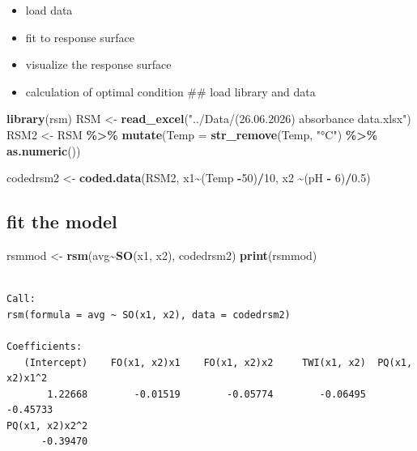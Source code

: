 \documentclass[
  12pt,
]{article}
\newenvironment{Shaded}{\begin{snugshade}}{\end{snugshade}}
\newcommand{\AttributeTok}[1]{\textcolor[rgb]{0.13,0.29,0.53}{#1}}
\newcommand{\DecValTok}[1]{\textcolor[rgb]{0.00,0.00,0.81}{#1}}
\newcommand{\FloatTok}[1]{\textcolor[rgb]{0.00,0.00,0.81}{#1}}
\newcommand{\FunctionTok}[1]{\textcolor[rgb]{0.13,0.29,0.53}{\textbf{#1}}}
\newcommand{\NormalTok}[1]{#1}
\newcommand{\OtherTok}[1]{\textcolor[rgb]{0.56,0.35,0.01}{#1}}
\newcommand{\SpecialCharTok}[1]{\textcolor[rgb]{0.81,0.36,0.00}{\textbf{#1}}}
\newcommand{\StringTok}[1]{\textcolor[rgb]{0.31,0.60,0.02}{#1}}
\providecommand{\tightlist}{%
  \setlength{\itemsep}{0pt}\setlength{\parskip}{0pt}}
\begin{document}
\begin{itemize}
\tightlist
\item
  load data
\item
  fit to response surface
\item
  visualize the response surface
\item
  calculation of optimal condition \#\# load library and data
\end{itemize}

\begin{Shaded}
\begin{Highlighting}[]
\FunctionTok{library}\NormalTok{(rsm)}
\NormalTok{RSM }\OtherTok{\textless{}{-}} \FunctionTok{read\_excel}\NormalTok{(}\StringTok{"../Data/(26.06.2026) absorbance data.xlsx"}\NormalTok{)}
\NormalTok{RSM2 }\OtherTok{\textless{}{-}}\NormalTok{ RSM }\SpecialCharTok{\%\textgreater{}\%} \FunctionTok{mutate}\NormalTok{(}\AttributeTok{Temp =} \FunctionTok{str\_remove}\NormalTok{(Temp, }\StringTok{"°C"}\NormalTok{) }\SpecialCharTok{\%\textgreater{}\%} \FunctionTok{as.numeric}\NormalTok{())}

\NormalTok{codedrsm2 }\OtherTok{\textless{}{-}} \FunctionTok{coded.data}\NormalTok{(RSM2, }
\NormalTok{                        x1}\SpecialCharTok{\textasciitilde{}}\NormalTok{(Temp }\SpecialCharTok{{-}}\DecValTok{50}\NormalTok{)}\SpecialCharTok{/}\DecValTok{10}\NormalTok{,}
\NormalTok{                        x2 }\SpecialCharTok{\textasciitilde{}}\NormalTok{(pH }\SpecialCharTok{{-}} \DecValTok{6}\NormalTok{)}\SpecialCharTok{/}\FloatTok{0.5}\NormalTok{)}
\end{Highlighting}
\end{Shaded}

\subsection{fit the model}\label{fit-the-model}

\begin{Shaded}
\begin{Highlighting}[]
\NormalTok{rsmmod }\OtherTok{\textless{}{-}} \FunctionTok{rsm}\NormalTok{(avg}\SpecialCharTok{\textasciitilde{}}\FunctionTok{SO}\NormalTok{(x1, x2), codedrsm2)}
\FunctionTok{print}\NormalTok{(rsmmod)}
\end{Highlighting}
\end{Shaded}

\begin{verbatim}

Call:
rsm(formula = avg ~ SO(x1, x2), data = codedrsm2)

Coefficients:
   (Intercept)    FO(x1, x2)x1    FO(x1, x2)x2     TWI(x1, x2)  PQ(x1, x2)x1^2  
       1.22668        -0.01519        -0.05774        -0.06495        -0.45733  
PQ(x1, x2)x2^2  
      -0.39470  
\end{verbatim}
\end{document}
